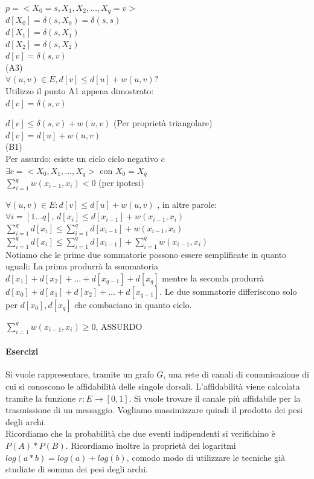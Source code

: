 \documentclass[tikz]{article}
\let\oldparagraph\paragraph
\renewcommand{\paragraph}[1]{\oldparagraph{#1}\mbox{}}
\begin{document}
{{$p = <X_0=s, X_1, X_2, \ldots, X_q=v>$ \\
$d[X_0] = \delta(s,X_0) = \delta(s,s)$ \\
$d[X_1] = \delta(s,X_1)$ \\
$d[X_2] = \delta(s,X_2)$ \\
$d[v] = \delta(s,v)$ \\

(A3) \\ 
$\forall (u,v) \in E, d[v] \leq d[u] + w(u,v) ? $\\
Utilizzo il punto A1 appena dimostrato:\\
$d[v] = \delta(s,v)$

$d[v] \leq \delta(s,v) + w(u,v)$ (Per proprietà triangolare)\\
$d[v] = d[u] + w(u,v)$ \\

(B1) \\ 
Per assurdo: esiste un ciclo ciclo negativo $c$ \\
$\exists c = <X_0,X_1,\ldots,X_q>$ con $X_0 =  X_q$ \\ 
$\sum_{i=1}^{q}{w(x_{i-1},x_i)} < 0$ (per ipotesi)

$\forall (u,v) \in E : d[v] \leq d[u] + w(u,v)$ , in altre parole: \\
$\forall i = [1\ldots q],\,d[x_i] \leq d[x_{i-1}] + w(x_{i-1},x_i)$ \\ 

$\sum_{i=1}^q{d[x_i]} \leq \sum_{i=1}^q{d[x_{i-1}] + w(x_{i-1},x_i)}$ \\

$\sum_{i=1}^q{d[x_i]} \leq \sum_{i=1}^q{d[x_{i-1}]} + \sum_{i=1}^q{w(x_{i-1},x_i)}$ \\

Notiamo che le prime due sommatorie possono essere semplificate in quanto uguali: La prima produrrà la sommatoria $d[x_1] + d[x_2] +\ldots + d[x_{q-1}] + d[x_q]$ mentre la seconda produrrà  $d[x_0] + d[x_1] + d[x_2] +\ldots + d[x_{q-1}]$. Le due sommatorie differiscono solo per $d[x_0],d[x_q]$ che combaciano in quanto ciclo.

$\sum_{i=1}^q{w(x_{i-1},x_i)} \geq 0$, ASSURDO


\paragraph{Esercizi}

Si vuole rappresentare, tramite un grafo $G$, una rete di canali di comunicazione di cui si conoscono le affidabilità delle singole dorsali. L'affidabilità viene calcolata tramite la funzione $r : E \rightarrow [0,1]$. Si vuole trovare il canale più affidabile per la trasmissione di un messaggio. Vogliamo massimizzare quindi il prodotto dei pesi degli archi. \\
Ricordiamo che la probabilità che due eventi indipendenti si verifichino è $P(A) * P(B)$. Ricordiamo inoltre la proprietà dei logaritmi $log(a*b) = log(a) + log(b)$, comodo modo di utilizzare le tecniche già studiate di somma dei pesi degli archi.

}}
\end{document}
